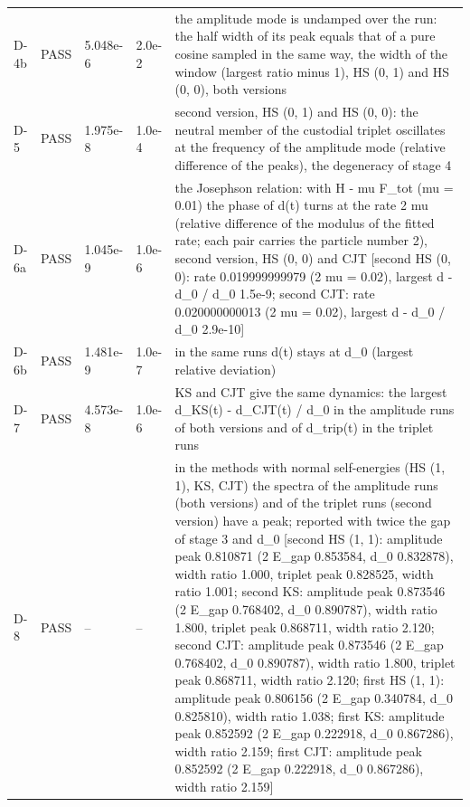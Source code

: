 \documentclass[aps,prd,onecolumn,superscriptaddress,nofootinbib,floatfix,longbibliography]{revtex4-2}
\begin{document}
\begin{longtable}{p{}p{}p{}p{}p{}}
D-4b & PASS & 5.048e-6 & 2.0e-2 & the amplitude mode is undamped over the run: the half width of its peak equals that of a pure cosine sampled in the same way, the width of the window (largest ratio minus 1), HS (0, 1) and HS (0, 0), both versions \\
D-5 & PASS & 1.975e-8 & 1.0e-4 & second version, HS (0, 1) and HS (0, 0): the neutral member of the custodial triplet oscillates at the frequency of the amplitude mode (relative difference of the peaks), the degeneracy of stage 4 \\
D-6a & PASS & 1.045e-9 & 1.0e-6 & the Josephson relation: with H - mu F\_tot (mu = 0.01) the phase of d(t) turns at the rate 2 mu (relative difference of the modulus of the fitted rate; each pair carries the particle number 2), second version, HS (0, 0) and CJT [second HS (0, 0): rate 0.019999999979 (2 mu = 0.02), largest \textbar{} \textbar{}d\textbar{} - d\_0 \textbar{} / d\_0 1.5e-9; second CJT: rate 0.020000000013 (2 mu = 0.02), largest \textbar{} \textbar{}d\textbar{} - d\_0 \textbar{} / d\_0 2.9e-10] \\
D-6b & PASS & 1.481e-9 & 1.0e-7 & in the same runs \textbar{}d(t)\textbar{} stays at d\_0 (largest relative deviation) \\
D-7 & PASS & 4.573e-8 & 1.0e-6 & KS and CJT give the same dynamics: the largest \textbar{}d\_KS(t) - d\_CJT(t)\textbar{} / d\_0 in the amplitude runs of both versions and of d\_trip(t) in the triplet runs \\
D-8 & PASS & -- & -- & in the methods with normal self-energies (HS (1, 1), KS, CJT) the spectra of the amplitude runs (both versions) and of the triplet runs (second version) have a peak; reported with twice the gap of stage 3 and d\_0 [second HS (1, 1): amplitude peak 0.810871 (2 E\_gap 0.853584, d\_0 0.832878), width ratio 1.000, triplet peak 0.828525, width ratio 1.001; second KS: amplitude peak 0.873546 (2 E\_gap 0.768402, d\_0 0.890787), width ratio 1.800, triplet peak 0.868711, width ratio 2.120; second CJT: amplitude peak 0.873546 (2 E\_gap 0.768402, d\_0 0.890787), width ratio 1.800, triplet peak 0.868711, width ratio 2.120; first HS (1, 1): amplitude peak 0.806156 (2 E\_gap 0.340784, d\_0 0.825810), width ratio 1.038; first KS: amplitude peak 0.852592 (2 E\_gap 0.222918, d\_0 0.867286), width ratio 2.159; first CJT: amplitude peak 0.852592 (2 E\_gap 0.222918, d\_0 0.867286), width ratio 2.159] \\
\end{longtable}
\endgroup
\end{document}
